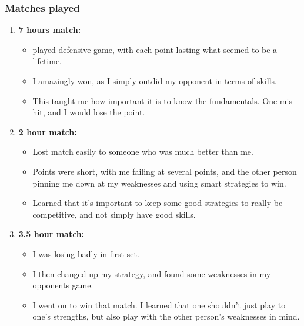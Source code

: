 \begin{frame}
\frametitle{Matches played}
\begin{enumerate}
\item \small \textbf{7 hours match:}
\begin{itemize}
\item \tiny played defensive game, with each point lasting what seemed to be a lifetime.
\item \tiny I amazingly won, as I simply outdid my opponent in terms of skills.
\item \tiny This taught me how important it is to know the fundamentals. One mis-hit, and I would lose the point.
\end{itemize}

\item \small \textbf{2 hour match:}
\begin{itemize}
\item \tiny Lost match easily to someone who was much better than me.
\item \tiny Points were short, with me failing at several points, and the other person pinning me down at my weaknesses and using smart strategies to win.
\item \tiny Learned that it's important to keep some good strategies to really be competitive, and not simply have good skills.
\end{itemize}
\item \small \textbf{3.5 hour match:}
\begin{itemize}
\item \tiny I was losing badly in first set.
\item \tiny I then changed up my strategy,  and found some weaknesses in my opponents game.
\item \tiny I went on to win that match.  I learned that one shouldn't just play to one's strengths, but also play with the other person's weaknesses in mind.
\end{itemize}
\end{enumerate}
\end{frame}

